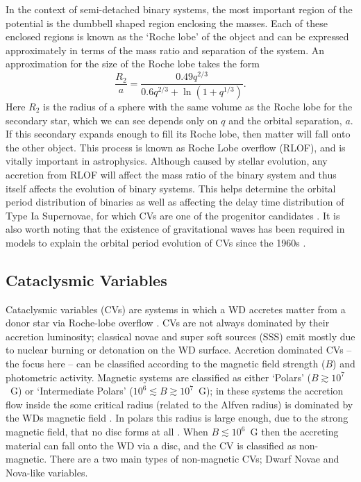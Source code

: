 In the context of semi-detached binary systems, the most important region of the 
potential is the dumbbell shaped region enclosing the masses. Each of these
enclosed regions is known as the `Roche lobe' of the object and can be expressed 
approximately in terms of the mass ratio and separation of the system. An approximation for the size of the Roche lobe takes the form \citep{eggleton1983}
\begin{equation}
\frac{R_2}{a} = \frac{0.49 q^{2/3}}{0.6q^{2/3} + \ln(1+q^{1/3})}.
\label{eq:roche2}
\end{equation} 
Here $R_2$ is the radius of a sphere with the same volume as the Roche lobe for the
secondary star, which we can see depends only on $q$ and the orbital separation, 
$a$. If this secondary expands enough to fill its Roche lobe, then matter
will fall onto the other object. This process is known as Roche Lobe overflow (RLOF),
and is vitally important in astrophysics. Although caused by stellar evolution,
any accretion from RLOF will affect the mass ratio of the binary system 
and thus itself affects the evolution
of binary systems. This helps determine the orbital period
distribution of binaries \citep[e.g.][]{knigge2011_evo} 
as well as affecting the delay time distribution
of Type Ia Supernovae, for which CVs are one of the progenitor candidates 
\citep[e.g.][]{wang2012}.
It is also worth noting that the existence of gravitational waves has been 
required in models to explain the orbital period evolution of CVs since
the 1960s \citep{kraft1962}. 


\subsection{Cataclysmic Variables}

Cataclysmic variables (CVs) are systems in which a WD
accretes matter from a donor star via Roche-lobe overflow 
\citep[see the `CV bible', ][]{warnerbook}. 
CVs are not always dominated by their accretion luminosity; 
classical novae and super soft sources 
(SSS) emit mostly due to nuclear burning or detonation on the WD surface.
Accretion dominated CVs -- the focus here -- can be classified according to the 
magnetic field strength ($B$) and photometric activity. 
Magnetic systems are classified as either `Polars' ($B \gtrsim 10^7$~G)
or `Intermediate Polars' ($10^6 \lesssim B \gtrsim 10^7$~G);
in these systems the accretion flow inside the some critical radius 
(related to the Alfven radius)
is dominated by the WDs magnetic field \citep[e.g.][]{patterson1994}. 
In polars this radius is large enough, due to the strong magnetic field,
that no disc forms at all \citep{liebert1985}.
When $B \lesssim 10^6$~G then the accreting material can fall
onto the WD via a disc, and the CV is classified as non-magnetic.
There are a two main types of non-magnetic CVs; Dwarf Novae and Nova-like
variables.

